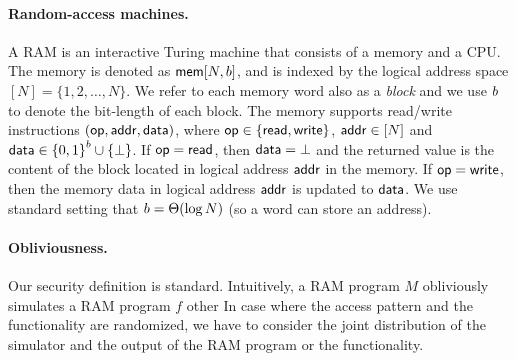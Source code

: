 \paragraph{Random-access machines.}
A RAM is an interactive Turing machine that consists of a memory and a CPU.  The
memory is denoted as ${\mathsf{mem}}[{N},{b}]$, and is indexed by the logical
address space $[N] = \{1,2,\ldots,N\}$. We refer to each memory word also as a
\emph{block} and we use $b$ to denote the bit-length of each block. The memory supports read/write
instructions $(\mathsf{op},{\mathsf{addr}}, {\mathsf{data}})$, where $\mathsf{op} \in \{{\mathsf{read}},{\mathsf{write}}\}$, ${\mathsf{addr}} \in
[N]$ and ${\mathsf{data}} \in {\{0,1\}}^{b} \cup \{\bot\}$.  If $\mathsf{op} = {\mathsf{read}}$, then
${\mathsf{data}}=\bot$ and the returned value is the content of the block located in
logical address ${\mathsf{addr}}$ in the memory. If $\mathsf{op}={\mathsf{write}}$, then the memory data in
logical address ${\mathsf{addr}}$ is updated to ${\mathsf{data}}$.
We use standard setting that ${b} = \Theta(\log N)$ (so a word can 
store an address).

\paragraph{Obliviousness.} 
Our security definition is standard. Intuitively, a RAM program $M$ obliviously simulates a RAM program $f$ other In case where the access pattern and the functionality are randomized, we have to consider the joint distribution of the simulator and the output of the RAM program or the functionality. 


